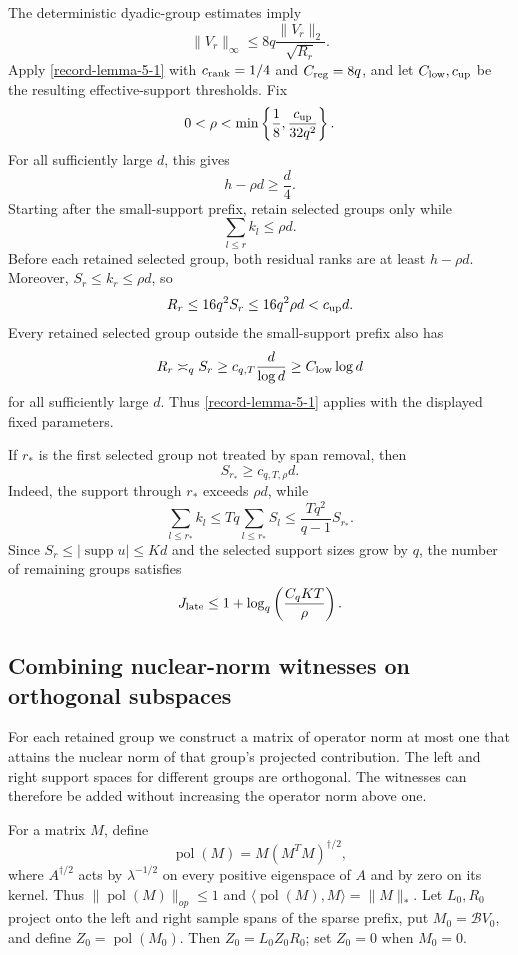 \documentclass[11pt]{article}
\numberwithin{equation}{section}
\theoremstyle{definition}
\theoremstyle{remark}
\newcommand{\1}{\boldsymbol 1}
\begin{document}
\begin{aiblock}
The deterministic dyadic-group estimates imply
\[
  \|V_{r}\|_{\infty}\le8q\frac{\|V_{r}\|_{2}}
  {\sqrt{R_{r}}}.
\]
Apply \cref{record-lemma-5-1} with $c_{\rm rank}=1/4$
and $C_{\rm reg}=8q$, and let $C_{\rm low},c_{\rm up}$
be the resulting effective-support thresholds. Fix
\[
  0<\rho<\min\left\{\frac18,
  \frac{c_{\rm up}}{32q^{2}}\right\}.
\]
For all sufficiently large $d$, this gives
\[
  h-\rho d\ge\frac{d}{4}.
\]
Starting after the small-support prefix, retain
selected groups only while
\[
  \sum_{l\le r}k_{l}\le\rho d.
\]
Before each retained selected group, both residual
ranks are at least $h-\rho d$. Moreover,
$S_{r}\le k_{r}\le\rho d$, so
\[
  R_{r}\le16q^{2}S_{r}\le16q^{2}\rho d<c_{\rm up}d.
\]
Every retained selected group outside the small-support
prefix also has
\[
  R_{r}\asymp_{q}S_{r}\ge c_{q,T}\frac{d}{\log d}
  \ge C_{\rm low}\log d
\]
for all sufficiently large $d$. Thus
\cref{record-lemma-5-1} applies with the displayed fixed
parameters.

If $r_{*}$ is the first selected group not treated by
span removal, then
\[
  S_{r_{*}}\ge c_{q,T,\rho}d.
\]
Indeed, the support through $r_{*}$ exceeds $\rho d$,
while
\[
  \sum_{l\le r_{*}}k_{l}\le Tq\sum_{l\le r_{*}}S_{l}\le
  \frac{Tq^{2}}{q-1}S_{r_{*}}.
\]
Since $S_{r}\le|\operatorname{supp}u|\le Kd$ and the
selected support sizes grow by $q$, the number of
remaining groups satisfies
\[
  J_{\rm late}\le1+\log_{q}
  \left(\frac{C_{q}KT}{\rho}\right).
\]


\subsection{Combining nuclear-norm witnesses on
  orthogonal subspaces}\label{orthogonal-polar-aggregation}

For each retained group we construct a matrix of operator
norm at most one that attains the nuclear norm of that
group's projected contribution. The left and right support
spaces for different groups are orthogonal. The witnesses
can therefore be added without increasing the operator norm
above one.

For a matrix $M$, define
\[
  \operatorname{pol}(M)=M(M^TM)^{\dagger/2},
\]
where $A^{\dagger/2}$ acts by $\lambda^{-1/2}$ on every
positive eigenspace of $A$ and by zero on its kernel. Thus
$\|\operatorname{pol}(M)\|_{op}\le1$ and
$\langle\operatorname{pol}(M),M\rangle=\|M\|_*$. Let
$L_0,R_0$ project onto the left and right sample spans of
the sparse prefix, put $M_0=\mathcal{B}V_0$, and define
$Z_0=\operatorname{pol}(M_0)$. Then $Z_0=L_0Z_0R_0$; set
$Z_0=0$ when $M_0=0$.


\end{aiblock}
\end{document}

